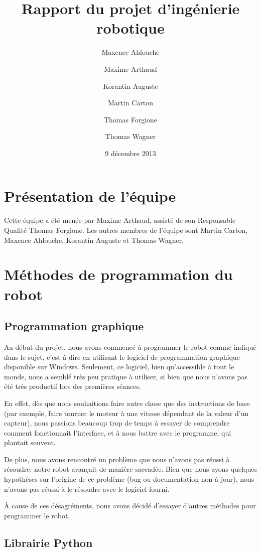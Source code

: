 \documentclass{scrartcl}
\author{Maxence Ahlouche \and Maxime Arthaud \and Korantin Auguste
  \and Martin Carton \and Thomas Forgione \and Thomas Wagner}
\title{Rapport du projet d'ingénierie robotique}
\date{9 décembre 2013}
\begin{document}
\maketitle
\tableofcontents
\newpage

\section{Présentation de l'équipe}
Cette équipe a été menée par Maxime Arthaud, assisté de son Responsable
Qualité Thomas Forgione. Les autres membres de l'équipe sont Martin Carton,
Maxence Ahlouche, Korantin Auguste et Thomas Wagner.

\section{Méthodes de programmation du robot}
\subsection{Programmation graphique}

Au début du projet, nous avons commencé à programmer le robot comme
indiqué dans le sujet, c'est à dire en utilisant le logiciel de programmation
graphique disponible sur Windows. Seulement, ce logiciel, bien
qu'accessible à tout le monde, nous a semblé très peu pratique %
à utiliser, si bien que nous n'avons pas été très productif lors des
premières séances.

En effet, dès que nous souhaitions faire autre
chose que des instructions de base (par exemple, faire tourner le
moteur à une vitesse dépendant de la valeur d'un capteur), nous
passions beaucoup trop de temps à essayer de comprendre comment fonctionnait
l'interface, et à nous battre avec le programme, qui plantait souvent.

De plus, nous avons rencontré un problème que nous n'avons pas réussi
à résoudre: notre robot avançait de manière saccadée. Bien que nous ayons
quelques hypothèses sur l'origine de ce problème (bug ou documentation non à
jour), nous n'avons pas réussi à le résoudre avec le logiciel fourni.

À cause de ces désagréments, nous avons décidé d'essayer
d'autres méthodes pour programmer le robot.

\subsection{Librairie Python}
\end{document}
